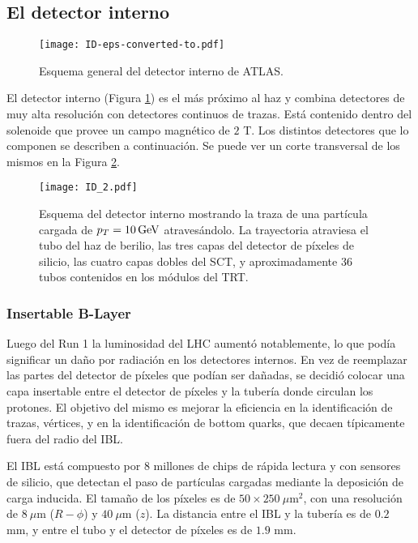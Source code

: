 \subsection{El detector interno}

\begin{figure}
\centering
\texttt{[image: ID-eps-converted-to.pdf]}
\caption{Esquema general del detector interno de ATLAS.}
\label{ID}
\end{figure}


El detector interno (Figura \ref{ID}) es el más próximo al haz y combina detectores de muy alta resolución con detectores continuos de trazas. Está contenido dentro del solenoide que provee un campo magnético de $2$ T. Los distintos detectores que lo componen se describen a continuación. Se puede ver un corte transversal de los mismos en la Figura \ref{ID_2}.

\begin{figure}
\centering
\texttt{[image: ID\_2.pdf]}
\caption{Esquema del detector interno mostrando la traza de una partícula cargada de $p_{T}=10 \, \mathrm{GeV}$ atravesándolo. La trayectoria atraviesa el tubo del haz de  berilio, las tres capas del detector de píxeles de silicio, las cuatro capas dobles del SCT, y aproximadamente 36 tubos contenidos en los módulos del TRT.}
\label{ID_2}
\end{figure}

\subsubsection{Insertable B-Layer}

Luego del Run 1 la luminosidad del LHC aumentó notablemente, lo que podía significar un daño por radiación en los detectores internos. En vez de reemplazar las partes del detector de píxeles que podían ser dañadas, se decidió colocar una capa insertable entre el detector de píxeles y la tubería donde circulan los protones. El objetivo del mismo es mejorar la eficiencia en la identificación de trazas, vértices, y en la identificación de bottom quarks, que decaen típicamente fuera del radio del IBL.

El IBL está compuesto por $8$ millones de chips de rápida lectura y con sensores de silicio, que detectan el paso de partículas cargadas mediante la deposición de carga inducida. El tamaño de los píxeles es de $50\times250\:\mu$m$^{2}$, con una resolución de $8\:\mu$m ($R-\phi$) y $40\:\mu$m ($z$). La distancia entre el IBL y la tubería es de $0.2$ mm, y entre el tubo y el detector de píxeles es de $1.9$ mm. 


